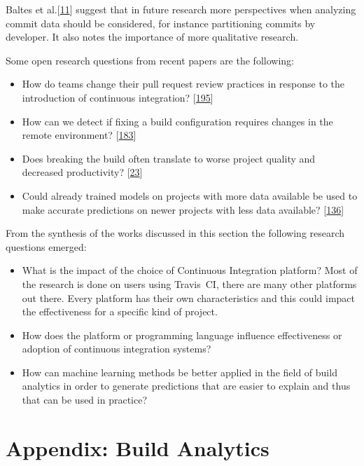 \documentclass[]{book}
\providecommand{\tightlist}{%
  \setlength{\itemsep}{0pt}\setlength{\parskip}{0pt}}
\begin{document}
Baltes et al.{[}\protect\hyperlink{ref-baltes2018no}{11}{]} suggest that
in future research more perspectives when analyzing commit data should
be considered, for instance partitioning commits by developer. It also
notes the importance of more qualitative research.

Some open research questions from recent papers are the following:

\begin{itemize}
\tightlist
\item
  How do teams change their pull request review practices in response to
  the introduction of continuous integration?
  {[}\protect\hyperlink{ref-zhao2017impact}{195}{]}
\item
  How can we detect if fixing a build configuration requires changes in
  the remote environment?
  {[}\protect\hyperlink{ref-vassallo2018break}{183}{]}
\item
  Does breaking the build often translate to worse project quality and
  decreased productivity?
  {[}\protect\hyperlink{ref-beller2017oops}{23}{]}
\item
  Could already trained models on projects with more data available be
  used to make accurate predictions on newer projects with less data
  available? {[}\protect\hyperlink{ref-ni2018acona}{136}{]}
\end{itemize}

From the synthesis of the works discussed in this section the following
research questions emerged:

\begin{itemize}
\tightlist
\item
  What is the impact of the choice of Continuous Integration platform?
  Most of the research is done on users using Travis~CI, there are many
  other platforms out there. Every platform has their own
  characteristics and this could impact the effectiveness for a specific
  kind of project.
\item
  How does the platform or programming language influence effectiveness
  or adoption of continuous integration systems?
\item
  How can machine learning methods be better applied in the field of
  build analytics in order to generate predictions that are easier to
  explain and thus that can be used in practice?
\end{itemize}

\chapter*{Appendix: Build Analytics}\label{appendix-build-analytics}
\end{document}
